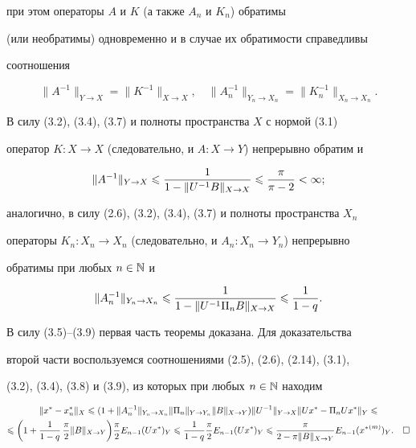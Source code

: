 при этом операторы $A$ и $K$ (а также $A_n$ и $K_n$) обратимы


(или необратимы) одновременно и в случае их обратимости справедливы 


соотношения


\begin{equation}


\|A^{-1}\|_{Y\to X} = \|K^{-1}\|_{X\to X},


\quad \|A_n^{-1}\|_{Y_n\to X_n} = \|K_n^{-1}\|_{X_n\to X_n}.


\end{equation}


В силу (3.2), (3.4), (3.7) и полноты пространства $X$ с нормой (3.1) 


оператор $K:X\to X$ (следовательно, и $A:X\to Y$) непрерывно обратим и


\begin{equation}


\|A^{-1}\|_{Y\to X}\lea \frac{1}{1-\|U^{-1}B\|_{X\to X}} \lea \frac{\pi}{\pi-2}<\infty;


\end{equation}


аналогично, в силу (2.6), (3.2), (3.4), (3.7) и полноты пространства $X_n$ 


операторы $K_n:X_n\to X_n$ (следовательно, и $A_n:X_n\to Y_n$) непрерывно 


обратимы при любых $n\in \Bbb{N}$ и


\begin{equation}


\|A^{-1}_n\|_{Y_n\to X_n} \lea


\frac{1}{1 - \|U^{-1}\Pi_n B\|_{X\to X}}\lea \frac{1}{1-q}.


\end{equation}





В силу (3.5)--(3.9) первая часть теоремы доказана. Для доказательства 


второй части воспользуемся соотношениями (2.5), (2.6), (2.14), (3.1),


(3.2), (3.4), (3.8) и (3.9), из которых при любых $n\in\Bbb{N}$  находим


\begin{gather*}


\|x^* - x^*_n\|_X \lea (1+\|A^{-1}_n\|_{Y_n\to X_n}


\|\Pi_n\|_{Y\to Y_n} \|B\|_{X\to Y})\|U^{-1}\|_{Y\to X}


\|U x^* - \Pi_n Ux^*\|_Y \lea \\


%


\lea \bigg(1+\frac{1}{1-q}\,\frac{\pi}{2}\|B\|_{X\to Y}\bigg)


\frac{\pi}{2}E_{n-1}(Ux^*)_Y \lea


\frac{1}{1-q}\frac{\pi}{2}E_{n-1}(Ux^*)_Y \lea


\frac{\pi}{2-\pi\|B\|_{X\to Y}}E_{n-1}({x^*}^{(m)})_{Y}.\quad\square


\end{gather*}








